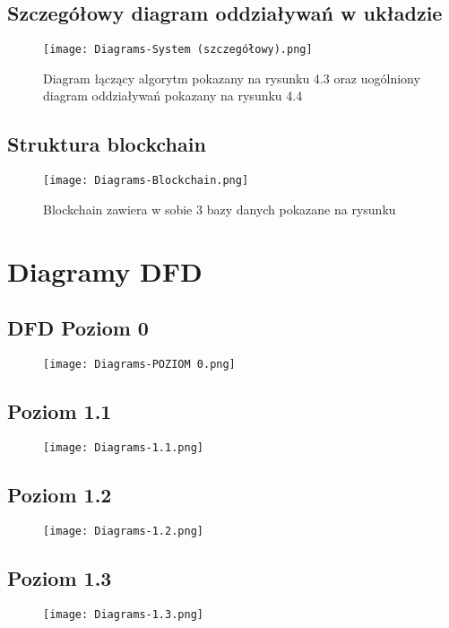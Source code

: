 \documentclass{article}
\begin{document}
\subsection{Szczegółowy diagram oddziaływań w układzie}
\begin{figure}[!htb]
\centering
\texttt{[image: Diagrams-System (szczegółowy).png]}
\caption{Diagram łączący algorytm pokazany na rysunku 4.3 oraz uogólniony diagram oddziaływań pokazany na rysunku 4.4}
\end{figure}
\FloatBarrier

\subsection{Struktura blockchain}
\begin{figure}[!htb]
\centering
\texttt{[image: Diagrams-Blockchain.png]}
\caption{Blockchain zawiera w sobie 3 bazy danych pokazane na rysunku}
\end{figure}
\FloatBarrier

\section{Diagramy DFD} 

\subsection{DFD Poziom 0}
\begin{figure}[!htb]
\centering
\texttt{[image: Diagrams-POZIOM 0.png]}
\caption{}
\end{figure}
\FloatBarrier

\subsection{Poziom 1.1}
\begin{figure}[!htb]
\centering
\texttt{[image: Diagrams-1.1.png]}
\caption{}
\end{figure}
\FloatBarrier

\subsection{Poziom 1.2}
\begin{figure}[!htb]
\centering
\texttt{[image: Diagrams-1.2.png]}
\caption{}
\end{figure}

\subsection{Poziom 1.3}
\begin{figure}[!htb]
\centering
\texttt{[image: Diagrams-1.3.png]}
\caption{}
\end{figure}
\FloatBarrier
\end{document}
